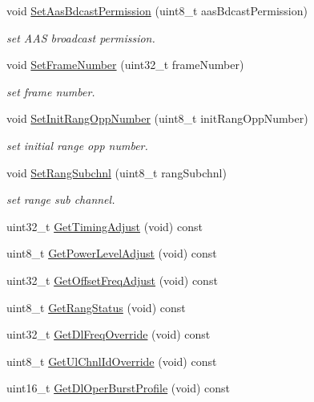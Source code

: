 \begin{DoxyCompactItemize}
void \hyperlink{classns3_1_1RngRsp_a6a72eb671e5266aeee477b5bedf9cac4}{Set\+Aas\+Bdcast\+Permission} (uint8\+\_\+t aas\+Bdcast\+Permission)
\begin{DoxyCompactList}\small\item\em set A\+AS broadcast permission. \end{DoxyCompactList}\item 
void \hyperlink{classns3_1_1RngRsp_a906eebd3e77d60be4d2e0795b0635b2f}{Set\+Frame\+Number} (uint32\+\_\+t frame\+Number)
\begin{DoxyCompactList}\small\item\em set frame number. \end{DoxyCompactList}\item 
void \hyperlink{classns3_1_1RngRsp_a8a645d660d712df617deddb46efc5528}{Set\+Init\+Rang\+Opp\+Number} (uint8\+\_\+t init\+Rang\+Opp\+Number)
\begin{DoxyCompactList}\small\item\em set initial range opp number. \end{DoxyCompactList}\item 
void \hyperlink{classns3_1_1RngRsp_a7bcee4de3d46b7a4016c74fe4953c377}{Set\+Rang\+Subchnl} (uint8\+\_\+t rang\+Subchnl)
\begin{DoxyCompactList}\small\item\em set range sub channel. \end{DoxyCompactList}\item 
uint32\+\_\+t \hyperlink{classns3_1_1RngRsp_ac245c69e8a03cc486b9478e34e2e51c0}{Get\+Timing\+Adjust} (void) const 
\item 
uint8\+\_\+t \hyperlink{classns3_1_1RngRsp_a17110063cde50f861bc5f9f20c8afb33}{Get\+Power\+Level\+Adjust} (void) const 
\item 
uint32\+\_\+t \hyperlink{classns3_1_1RngRsp_afc06a53d1d91db8adfa485a436fa425f}{Get\+Offset\+Freq\+Adjust} (void) const 
\item 
uint8\+\_\+t \hyperlink{classns3_1_1RngRsp_a0d28c78c318894b103d8ecbef4233307}{Get\+Rang\+Status} (void) const 
\item 
uint32\+\_\+t \hyperlink{classns3_1_1RngRsp_a5a37097b057b9baa5d95aa8d92d205cf}{Get\+Dl\+Freq\+Override} (void) const 
\item 
uint8\+\_\+t \hyperlink{classns3_1_1RngRsp_a27f33490901f290c4bd97029e0248a05}{Get\+Ul\+Chnl\+Id\+Override} (void) const 
\item 
uint16\+\_\+t \hyperlink{classns3_1_1RngRsp_a5aaa19d32fe2b123ec60a82022639bd1}{Get\+Dl\+Oper\+Burst\+Profile} (void) const 

\end{DoxyCompactItemize}
